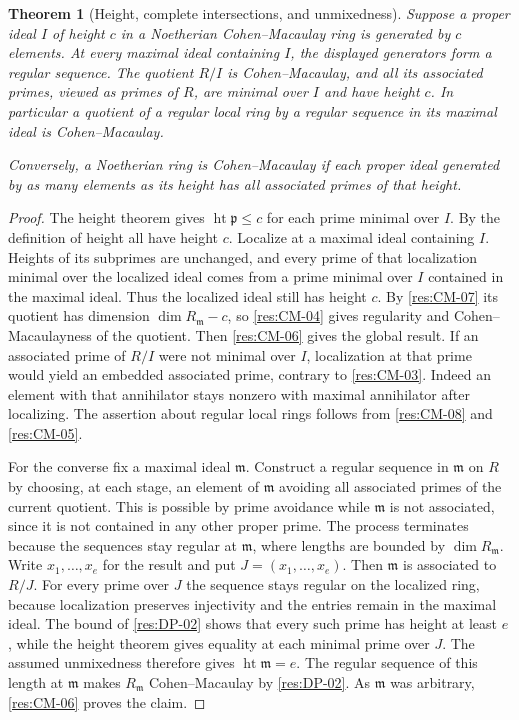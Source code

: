\documentclass[11pt,oneside,openany]{book}
\newtheorem{theorem}{Theorem}[chapter]
\theoremstyle{definition}
\theoremstyle{remark}
\begin{document}
\begin{theorem}[Height, complete intersections, and unmixedness]
\label{res:CM-09}
Suppose a proper ideal $I$ of height $c$ in a Noetherian
Cohen--Macaulay ring is generated by $c$ elements. At every
maximal ideal containing $I$, the displayed generators
form a regular sequence. The quotient $R/I$ is
Cohen--Macaulay, and all its associated primes, viewed as
primes of $R$, are minimal over $I$ and have height $c$.
In particular a quotient of a regular local ring by
a regular sequence in its maximal ideal is Cohen--Macaulay.

Conversely, a Noetherian ring is Cohen--Macaulay if each
proper ideal generated by as many elements as its height
has all associated primes of that height.
\end{theorem}
\begin{proof}
The height theorem \cite[ALG-05-C03-R01]{p103} gives
$\operatorname{ht}\mathfrak p\le c$ for each prime minimal over
$I$. By the definition of height all have height $c$.
Localize at a maximal ideal containing $I$. Heights of its
subprimes are unchanged, and every prime of that localization
minimal over the localized ideal comes from a prime minimal
over $I$ contained in the maximal ideal. Thus the localized
ideal still has height $c$. By \ref{res:CM-07} its quotient
has dimension $\dim R_{\mathfrak m}-c$, so
\ref{res:CM-04} gives regularity and Cohen--Macaulayness of
the quotient. Then \ref{res:CM-06} gives the global result.
If an associated prime of $R/I$ were not minimal over $I$,
localization at that prime would yield an embedded associated
prime, contrary to \ref{res:CM-03}. Indeed an element with that
annihilator stays nonzero with maximal annihilator after
localizing. The assertion about regular local rings follows
from \ref{res:CM-08} and \ref{res:CM-05}.

For the converse fix a maximal ideal $\mathfrak m$.
Construct a regular sequence in $\mathfrak m$ on $R$ by
choosing, at each stage, an element of $\mathfrak m$
avoiding all associated primes of the current quotient.
This is possible by prime avoidance while $\mathfrak m$
is not associated, since it is not contained in any other
proper prime. The process terminates because the sequences
stay regular at $\mathfrak m$, where lengths are bounded
by $\dim R_{\mathfrak m}$. Write $x_1,\ldots,x_e$ for the
result and put $J=(x_1,\ldots,x_e)$. Then $\mathfrak m$
is associated to $R/J$.
For every prime over $J$ the sequence stays regular on the
localized ring, because localization preserves injectivity
and the entries remain in the maximal ideal. The bound of
\ref{res:DP-02} shows that every such prime has height at least
$e$, while the height theorem gives equality at each minimal
prime over $J$. The assumed unmixedness therefore gives
$\operatorname{ht}\mathfrak m=e$. The regular sequence
of this length at $\mathfrak m$ makes $R_{\mathfrak m}$
Cohen--Macaulay by \ref{res:DP-02}. As $\mathfrak m$ was arbitrary,
\ref{res:CM-06} proves the claim.
\end{proof}
\end{document}
